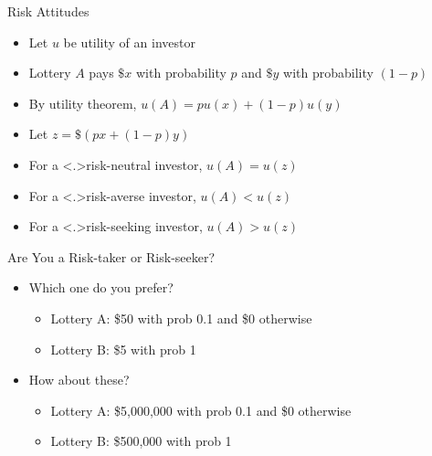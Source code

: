 \documentclass[11pt,aspectratio=169,handout]{beamer}
\begin{document}
  \begin{frame}{Risk Attitudes}
   \begin{itemize}[<+->]
    \item Let $u$ be utility of an investor
    \item Lottery $A$ pays $\$x$ with probability $p$ and $\$y$ with probability $(1-p)$
    \item By utility theorem, $u(A) = pu(x) + (1-p)u(y)$
    \item Let $z  = \$(px + (1-p)y)$
    \item For a \alert<.>{risk-neutral} investor, $u(A) = u(z)$
    \item For a \alert<.>{risk-averse} investor, $u(A) < u(z)$
    \item For a \alert<.>{risk-seeking} investor, $u(A) > u(z)$
   \end{itemize}
  \end{frame}
  
  \begin{frame}{Are You a Risk-taker or Risk-seeker?}
   \begin{itemize}
    \setlength{\itemsep}{2em}
    \item<1-> Which one do you prefer?
    \begin{itemize}
     \item Lottery A: \$50 with prob 0.1 and \$0 otherwise
     \item Lottery B: \$5 with prob 1
    \end{itemize}
    \item<2-> How about these?
    \begin{itemize}
     \item Lottery A: \$5,000,000 with prob 0.1 and \$0 otherwise
     \item Lottery B: \$500,000 with prob 1
    \end{itemize}
   \end{itemize}
  \end{frame}
  
\end{document}
